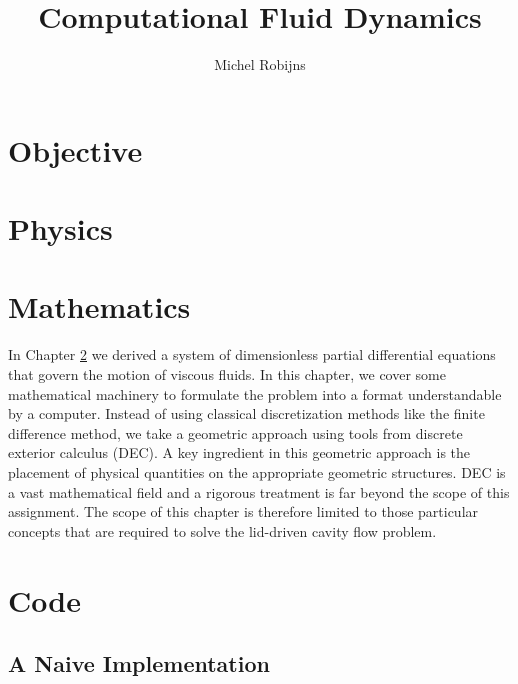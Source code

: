 \documentclass[a4paper,10pt,parskip=half]{scrreprt}
\begin{document}
\title{Computational Fluid Dynamics}
\author{Michel Robijns}

\maketitle

\tableofcontents

\chapter{Objective}



\chapter{Physics}
\label{cha:physics}



\chapter{Mathematics}
\label{cha:mathematics}

In Chapter \ref{cha:physics} we derived a system of dimensionless partial differential equations that govern the motion of viscous fluids. In this chapter, we cover some mathematical machinery to formulate the problem into a format understandable by a computer. Instead of using classical discretization methods like the finite difference method, we take a geometric approach using tools from discrete exterior calculus (DEC). A key ingredient in this geometric approach is the placement of physical quantities on the appropriate geometric structures. DEC is a vast mathematical field and a rigorous treatment is far beyond the scope of this assignment. The scope of this chapter is therefore limited to those particular concepts that are required to solve the lid-driven cavity flow problem.











\chapter{Code}

\section{A Naive Implementation}
\end{document}
